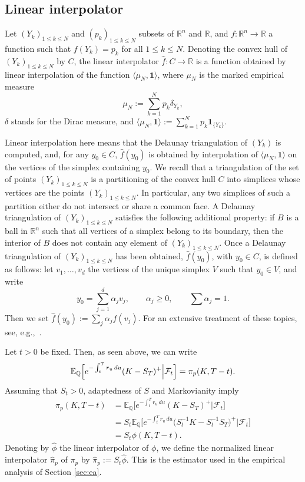 \documentclass[11pt]{article}
\theoremstyle{remark}
\newcommand{\E}{\mathbb{E}}
\newcommand{\cF}{\mathcal{F}}
\newcommand{\Q}{\mathbb{Q}}
\newcommand{\erre}{\mathbb{R}}
\begin{document}
\subsection{Linear interpolator}
\label{ssec:li}
Let $(Y_k)_{1\leq k \leq N}$ and $(p_k)_{1\leq k \leq N}$ subsets of
$\erre^n$ and $\erre$, and $f: \erre^n \to \erre$ a function such that
$f(Y_k)=p_k$ for all $1 \leq k \leq N$. Denoting the convex hull of
$(Y_k)_{1\leq k \leq N}$ by $C$, the linear interpolator
$\hat{f}:C \to \erre$ is a function obtained by linear interpolation
of the function $\langle\mu_N,\mathbf{1}\rangle$, where $\mu_N$ is the
marked empirical measure
\[
\mu_N := \sum_{k=1}^N p_k \delta_{Y_k},
\]
$\delta$ stands for the Dirac measure, and
$\langle\mu_N,\mathbf{1}\rangle := \sum_{k=1}^N p_k
\mathbf{1}_{\{Y_k\}}$.


Linear interpolation here means that the
Delaunay triangulation of $(Y_k)$ is computed, and, for any
$y_0 \in C$, $\hat{f}(y_0)$ is obtained by interpolation of
$\langle\mu_N,\mathbf{1}\rangle$ on the vertices of the simplex
containing $y_0$. We recall that a triangulation of the set of points
$(Y_k)_{1\leq k \leq N}$ is a partitioning of the convex hull $C$ into
simplices whose vertices are the points $(Y_k)_{1\leq k \leq N}$. In
particular, any two simplices of such a partition either do not
intersect or share a common face. A Delaunay triangulation of
$(Y_k)_{1\leq k \leq N}$ satisfies the following additional property:
if $B$ is a ball in $\erre^n$ such that all vertices of a simplex
belong to its boundary, then the interior of $B$ does not contain any
element of $(Y_k)_{1\leq k \leq N}$. Once a Delaunay triangulation of
$(Y_k)_{1\leq k \leq N}$ has been obtained, $\hat{f}(y_0)$, with
$y_0 \in C$, is defined as follows: let $v_1,\ldots,v_d$ the vertices
of the unique simplex $V$ such that $y_0 \in V$, and write
\[
  y_0 = \sum_{j=1}^d \alpha_j v_j, \qquad \alpha_j \geq 0, \qquad \sum
  \alpha_j=1.
\]
Then we set $\hat{f}(y_0) := \sum_j \alpha_j f(v_j)$. For an extensive
treatment of these topics, see, e.g.,~\cite{PreSha}.

\medskip

Let $t>0$ be fixed. Then, as seen above, we can write
\[
\E_\Q\Bigl[ e^{-\int_t^T r_u\,du} (K-S_T)^+ \Big\vert \cF_t \Bigr] 
= \pi_p(K,T-t).
\]
Assuming that $S_t>0$, adaptedness of $S$ and Markovianity
imply
\begin{align*}
  \pi_p(K,T-t) &=
  \E_{\Q} \bigl[ e^{-\int_t^T r_u\,du} (K-S_T)^+ \big\vert \cF_t \bigr]\\
  &= S_t \E_{\Q} \bigl[ e^{-\int_t^T r_u\,du} \bigl(S_t^{-1}K - S_t^{-1}S_T \bigr)^+
  \big\vert \cF_t \bigr]\\
  &= S_t \phi(K,T-t).
\end{align*}
Denoting by $\hat{\phi}$ the linear interpolator of $\phi$, we define
the normalized linear interpolator $\hat{\pi}_p$ of $\pi_p$ by
$\hat{\pi}_p := S_t\hat{\phi}$. This is the estimator used in the
empirical analysis of Section \ref{sec:ea}.
\end{document}
